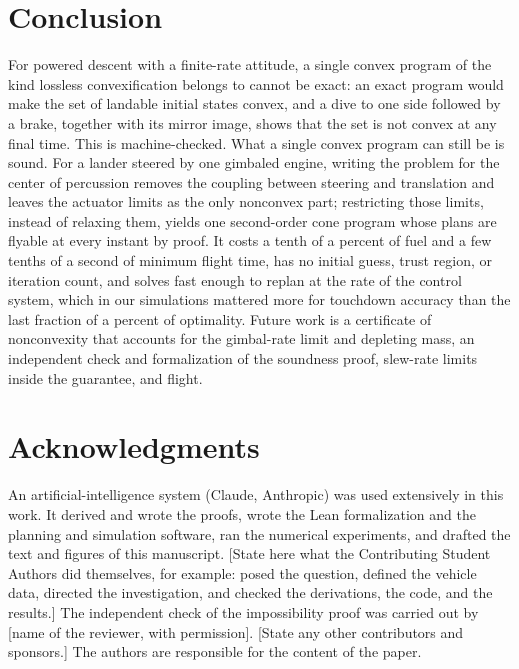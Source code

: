 \section{Conclusion}
For powered descent with a finite-rate attitude, a single convex program of the kind lossless convexification belongs to
cannot be exact: an exact program would make the set of landable initial states convex, and a dive to one side followed by a
brake, together with its mirror image, shows that the set is not convex at any final time. This is machine-checked. What a
single convex program can still be is sound. For a lander steered by one gimbaled engine, writing the problem for the center
of percussion removes the coupling between steering and translation and leaves the actuator limits as the only nonconvex
part; restricting those limits, instead of relaxing them, yields one second-order cone program whose plans are flyable at
every instant by proof. It costs a tenth of a percent of fuel and a few tenths of a second of minimum flight time, has no
initial guess, trust region, or iteration count, and solves fast enough to replan at the rate of the control system, which in
our simulations mattered more for touchdown accuracy than the last fraction of a percent of optimality. Future work is a
certificate of nonconvexity that accounts for the gimbal-rate limit and depleting mass, an independent check and
formalization of the soundness proof, slew-rate limits inside the guarantee, and flight.

\section*{Acknowledgments}
An artificial-intelligence system (Claude, Anthropic) was used extensively in this work. It derived and wrote the proofs,
wrote the Lean formalization and the planning and simulation software, ran the numerical experiments, and drafted the text
and figures of this manuscript. [State here what the Contributing Student Authors did themselves, for example: posed the
question, defined the vehicle data, directed the investigation, and checked the derivations, the code, and the results.] The
independent check of the impossibility proof was carried out by [name of the reviewer, with permission]. [State any other
contributors and sponsors.] The authors are responsible for the content of the paper.

